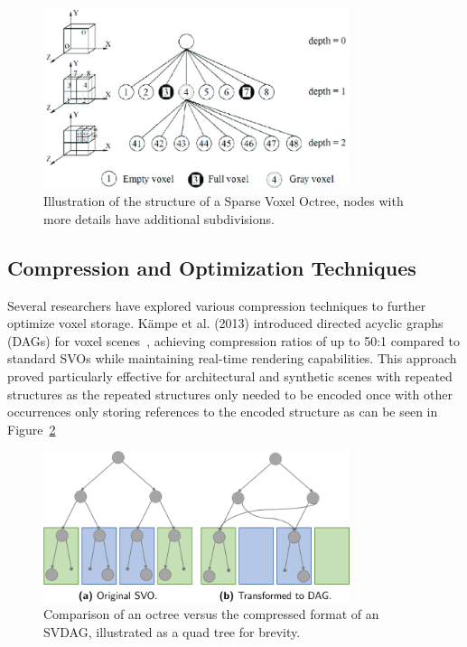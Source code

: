 \begin{figure}[thp]
    \begin{center}
        \includegraphics[width=0.8\textwidth]{figures/svo.png}
    \end{center}
    \caption{Illustration of the structure of a Sparse Voxel Octree, nodes with more details have additional
        subdivisions.~\protect\cite{truong2014octree}}
    \label{fig:evso}
\end{figure}

\subsection{Compression and Optimization Techniques}
Several researchers have explored various compression techniques to further optimize voxel storage. Kämpe et al. (2013)
introduced directed acyclic graphs (DAGs) for voxel scenes~\cite{kampe2013high}, achieving compression ratios of up to
50:1 compared to standard SVOs while maintaining real-time rendering capabilities. This approach proved particularly
effective for architectural and synthetic scenes with repeated structures as the repeated structures only needed to be
encoded once with other occurrences only storing references to the encoded structure as can be seen in
Figure~\ref{fig:svdag}

\begin{figure}[thp]
    \begin{center}
        \includegraphics[width=0.8\textwidth]{figures/svdag.png}
    \end{center}
    \caption{Comparison of an octree versus the compressed format of an SVDAG, illustrated as a quad tree for brevity.
        \protect\cite{dolonius2018sparse}}
    \label{fig:svdag}
\end{figure}

